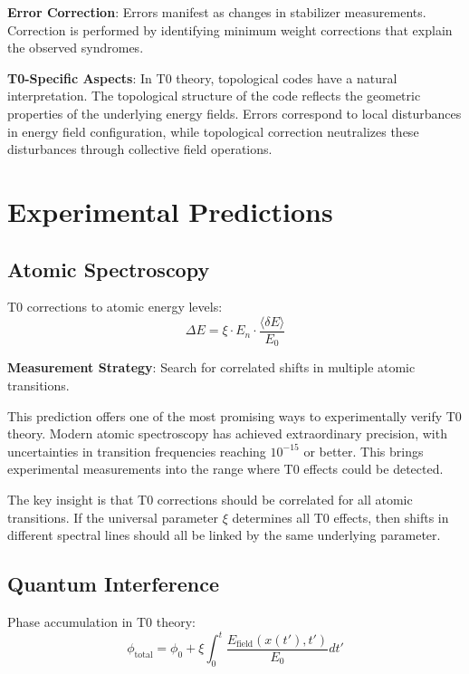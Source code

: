 \documentclass[12pt,a4paper]{article}
\newcommand{\deltaE}{\delta E}
\newcommand{\xipar}{\xi}
\theoremstyle{definition}
\theoremstyle{remark}
\begin{document}
	\textbf{Error Correction}:
	Errors manifest as changes in stabilizer measurements. Correction is performed by identifying minimum weight corrections that explain the observed syndromes.
	
	\textbf{T0-Specific Aspects}:
	In T0 theory, topological codes have a natural interpretation. The topological structure of the code reflects the geometric properties of the underlying energy fields. Errors correspond to local disturbances in energy field configuration, while topological correction neutralizes these disturbances through collective field operations.
	
	\section{Experimental Predictions}
	
	\subsection{Atomic Spectroscopy}
	
	T0 corrections to atomic energy levels:
	\begin{equation}
		\Delta E = \xipar \cdot E_n \cdot \frac{\langle \deltaE \rangle}{E_0}
		\label{eq:spectroscopic_shift}
	\end{equation}
	
	\textbf{Measurement Strategy}: Search for correlated shifts in multiple atomic transitions.
	
	This prediction offers one of the most promising ways to experimentally verify T0 theory. Modern atomic spectroscopy has achieved extraordinary precision, with uncertainties in transition frequencies reaching $10^{-15}$ or better. This brings experimental measurements into the range where T0 effects could be detected.
	
	The key insight is that T0 corrections should be correlated for all atomic transitions. If the universal parameter $\xipar$ determines all T0 effects, then shifts in different spectral lines should all be linked by the same underlying parameter.
	
	\subsection{Quantum Interference}
	
	Phase accumulation in T0 theory:
	\begin{equation}
		\phi_{\text{total}} = \phi_0 + \xipar \int_0^t \frac{E_{\text{field}}(x(t'), t')}{E_0} dt'
		\label{eq:phase_accumulation}
	\end{equation}
	
\end{document}
